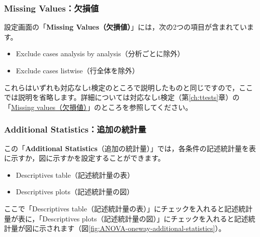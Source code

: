 \documentclass[
  12pt,
  a5jpaper,
  lualatex, ja=standard]{bxjsbook}
\providecommand{\tightlist}{%
  \setlength{\itemsep}{0pt}\setlength{\parskip}{0pt}}
\newenvironment{jmvsettings}{%
	\begin{center}%
	\begin{tcolorbox}[%
		title=設定項目,
		colframe=gmoji,
		colbacktitle=gmoji,
		colback=gmoji!2!white,
		breakable,
		width=.9\textwidth,
		]\small\addtolength{\leftmargini}{-3\labelsep}%
	}%
	{\end{tcolorbox}\end{center}}
\begin{document}
\hypertarget{missing-valuesux6b20ux640dux5024}{%
\subsubsection*{Missing Values：欠損値}\label{missing-valuesux6b20ux640dux5024}}

設定画面の「\textbf{Missing Values（欠損値）}」には，次の2つの項目が含まれています。

\begin{jmvsettings}

\begin{itemize}
\tightlist
\item
  Exclude cases analysis by analysis（分析ごとに除外）
\item
  Exclude cases listwise（行全体を除外）
\end{itemize}

\end{jmvsettings}

これらはいずれも対応なしt検定のところで説明したものと同じですので，ここでは説明を省略します。詳細については対応なしt検定（第\ref{ch:ttests}章）の「\protect\hyperlink{subsub:ttest-missing-values}{Missing values（欠損値）}」のところを参照してください。

\hypertarget{additional-statisticsux8ffdux52a0ux306eux7d71ux8a08ux91cf}{%
\subsubsection*{Additional Statistics：追加の統計量}\label{additional-statisticsux8ffdux52a0ux306eux7d71ux8a08ux91cf}}

この「\textbf{Additional Statistics}（追加の統計量）」では，各条件の記述統計量を表に示すか，図に示すかを設定することができます。

\begin{jmvsettings}

\begin{itemize}
\tightlist
\item
  Descriptives table（記述統計量の表）
\item
  Descriptives plots（記述統計量の図）
\end{itemize}

\end{jmvsettings}

ここで「Descriptives table（記述統計量の表）」にチェックを入れると記述統計量が表に，「Descriptives plots（記述統計量の図）」にチェックを入れると記述統計量が図に示されます（図\ref{fig:ANOVA-oneway-additional-statistics}）。
\end{document}
